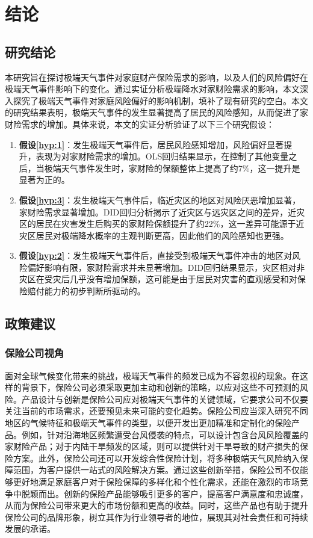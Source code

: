 \chapter{结论}\label{chap:5}

\section{研究结论}
本研究旨在探讨极端天气事件对家庭财产保险需求的影响，以及人们的风险偏好在极端天气事件影响下的变化。通过实证分析极端降水对家财险需求的影响，本文深入探究了极端天气事件对家庭风险偏好的影响机制，填补了现有研究的空白。本文的研究结果表明，极端天气事件的发生显著提高了居民的风险感知，从而促进了家财险需求的增加。具体来说，本文的实证分析验证了以下三个研究假设：

\begin{enumerate}
    \item \textbf{假设\ref{hyp:1}}：发生极端天气事件后，居民风险感知增加，风险偏好显著提升，表现为对家财险需求的增加。OLS回归结果显示，在控制了其他变量之后，当极端天气事件发生时，家财险的保额整体上提高了约7\%，这一提升是显著为正的。
    \item \textbf{假设\ref{hyp:3}}：发生极端天气事件后，临近灾区的地区对风险厌恶增加显著，家财险需求显著增加。DID回归分析揭示了近灾区与远灾区之间的差异，近灾区的居民在灾害发生后购买的家财险保额提升了约22\%，这一差异可能源于近灾区居民对极端降水概率的主观判断更高，因此他们的风险感知也更强。
    \item \textbf{假设\ref{hyp:2}}：发生极端天气事件后，直接受到极端天气事件冲击的地区对风险偏好影响有限，家财险需求并未显著增加。DID回归结果显示，灾区相对非灾区在受灾后几乎没有增加保额，这可能是由于居民对灾害的直观感受和对保险赔付能力的初步判断所驱动的。
\end{enumerate}

\section{政策建议}
\subsection{保险公司视角}
面对全球气候变化带来的挑战，极端天气事件的频发已成为不容忽视的现象。在这样的背景下，保险公司必须采取更加主动和创新的策略，以应对这些不可预测的风险。产品设计与创新是保险公司应对极端天气事件的关键领域，它要求公司不仅要关注当前的市场需求，还要预见未来可能的变化趋势。保险公司应当深入研究不同地区的气候特征和极端天气事件的类型，以便开发出更加精准和定制化的保险产品。例如，针对沿海地区频繁遭受台风侵袭的特点，可以设计包含台风风险覆盖的家财险产品；对于内陆干旱频发的区域，则可以提供针对干旱导致的财产损失的保险方案。此外，保险公司还可以开发综合性保险计划，将多种极端天气风险纳入保障范围，为客户提供一站式的风险解决方案。通过这些创新举措，保险公司不仅能够更好地满足家庭客户对于保险保障的多样化和个性化需求，还能在激烈的市场竞争中脱颖而出。创新的保险产品能够吸引更多的客户，提高客户满意度和忠诚度，从而为保险公司带来更大的市场份额和更高的收益。同时，这些产品也有助于提升保险公司的品牌形象，树立其作为行业领导者的地位，展现其对社会责任和可持续发展的承诺。

